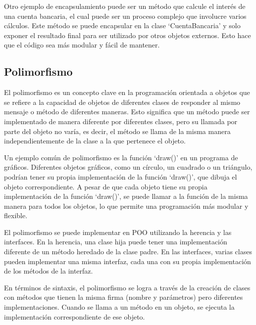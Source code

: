 \documentclass[executivepaper]{article}
\begin{document}
Otro ejemplo de encapsulamiento puede ser un método que calcule el interés de una cuenta bancaria, el cual puede ser un proceso complejo que involucre varios cálculos. Este método se puede encapsular en la clase \enquote*{CuentaBancaria} y solo exponer el resultado final para ser utilizado por otros objetos externos. Esto hace que el código sea más modular y fácil de mantener.

\subsection{Polimorfismo}

El polimorfismo es un concepto clave en la programación orientada a objetos que se refiere a la capacidad de objetos de diferentes clases de responder al mismo mensaje o método de diferentes maneras. Esto significa que un método puede ser implementado de manera diferente por diferentes clases, pero su llamada por parte del objeto no varía, es decir, el método se llama de la misma manera independientemente de la clase a la que pertenece el objeto.

Un ejemplo común de polimorfismo es la función \enquote*{draw()} en un programa de gráficos. Diferentes objetos gráficos, como un círculo, un cuadrado o un triángulo, podrían tener su propia implementación de la función \enquote*{draw()}, que dibuja el objeto correspondiente. A pesar de que cada objeto tiene su propia implementación de la función \enquote*{draw()}, se puede llamar a la función de la misma manera para todos los objetos, lo que permite una programación más modular y flexible.

El polimorfismo se puede implementar en POO utilizando la herencia y las interfaces. En la herencia, una clase hija puede tener una implementación diferente de un método heredado de la clase padre. En las interfaces, varias clases pueden implementar una misma interfaz, cada una con su propia implementación de los métodos de la interfaz.

En términos de sintaxis, el polimorfismo se logra a través de la creación de clases con métodos que tienen la misma firma (nombre y parámetros) pero diferentes implementaciones. Cuando se llama a un método en un objeto, se ejecuta la implementación correspondiente de ese objeto.
\end{document}
